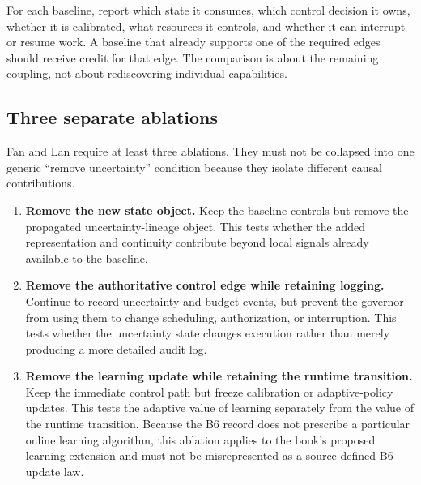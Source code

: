 For each baseline, report which state it consumes, which control decision it owns, whether it is calibrated, what resources it controls, and whether it can interrupt or resume work. A baseline that already supports one of the required edges should receive credit for that edge. The comparison is about the remaining coupling, not about rediscovering individual capabilities.

\subsection{Three separate ablations}
\label{sec:ch16-ablations}

Fan and Lan require at least three ablations. They must not be collapsed into one generic ``remove uncertainty'' condition because they isolate different causal contributions.

\begin{enumerate}
  \item \textbf{Remove the new state object.} Keep the baseline controls but remove the propagated uncertainty-lineage object. This tests whether the added representation and continuity contribute beyond local signals already available to the baseline.
  \item \textbf{Remove the authoritative control edge while retaining logging.} Continue to record uncertainty and budget events, but prevent the governor from using them to change scheduling, authorization, or interruption. This tests whether the uncertainty state changes execution rather than merely producing a more detailed audit log.
  \item \textbf{Remove the learning update while retaining the runtime transition.} Keep the immediate control path but freeze calibration or adaptive-policy updates. This tests the adaptive value of learning separately from the value of the runtime transition. Because the B6 record does not prescribe a particular online learning algorithm, this ablation applies to the book's proposed learning extension and must not be misrepresented as a source-defined B6 update law.
\end{enumerate}


